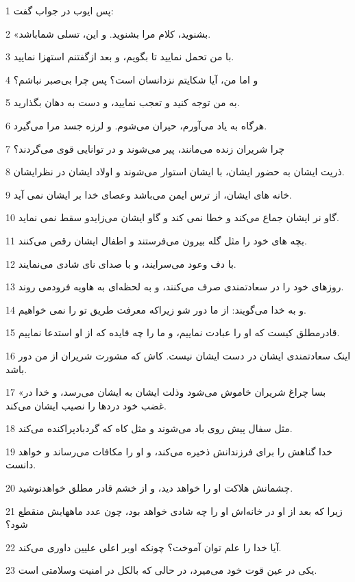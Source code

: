 \par 1 پس ایوب در جواب گفت:
\par 2 «بشنوید، کلام مرا بشنوید. و این، تسلی شماباشد.
\par 3 با من تحمل نمایید تا بگویم، و بعد ازگفتنم استهزا نمایید.
\par 4 و اما من، آیا شکایتم نزدانسان است؟ پس چرا بی‌صبر نباشم؟
\par 5 به من توجه کنید و تعجب نمایید، و دست به دهان بگذارید.
\par 6 هرگاه به یاد می‌آورم، حیران می‌شوم. و لرزه جسد مرا می‌گیرد.
\par 7 چرا شریران زنده می‌مانند، پیر می‌شوند و در توانایی قوی می‌گردند؟
\par 8 ذریت ایشان به حضور ایشان، با ایشان استوار می‌شوند و اولاد ایشان در نظرایشان.
\par 9 خانه های ایشان، از ترس ایمن می‌باشد وعصای خدا بر ایشان نمی آید.
\par 10 گاو نر ایشان جماع می‌کند و خطا نمی کند و گاو ایشان می‌زایدو سقط نمی نماید.
\par 11 بچه های خود را مثل گله بیرون می‌فرستند و اطفال ایشان رقص می‌کنند.
\par 12 با دف وعود می‌سرایند، و با صدای نای شادی می‌نمایند.
\par 13 روزهای خود را در سعادتمندی صرف می‌کنند، و به لحظه‌ای به هاویه فرودمی روند.
\par 14 و به خدا می‌گویند: از ما دور شو زیراکه معرفت طریق تو را نمی خواهیم.
\par 15 قادرمطلق کیست که او را عبادت نماییم، و ما را چه فایده که از او استدعا نماییم.
\par 16 اینک سعادتمندی ایشان در دست ایشان نیست. کاش که مشورت شریران از من دور باشد.
\par 17 «بسا چراغ شریران خاموش می‌شود وذلت ایشان به ایشان می‌رسد، و خدا در غضب خود دردها را نصیب ایشان می‌کند.
\par 18 مثل سفال پیش روی باد می‌شوند و مثل کاه که گردبادپراکنده می‌کند.
\par 19 خدا گناهش را برای فرزندانش ذخیره می‌کند، و او را مکافات می‌رساند و خواهد دانست.
\par 20 چشمانش هلاکت او را خواهد دید، و از خشم قادر مطلق خواهدنوشید.
\par 21 زیرا که بعد از او در خانه‌اش او را چه شادی خواهد بود، چون عدد ماههایش منقطع شود؟
\par 22 آیا خدا را علم توان آموخت؟ چونکه اوبر اعلی علیین داوری می‌کند.
\par 23 یکی در عین قوت خود می‌میرد، در حالی که بالکل در امنیت وسلامتی است.

